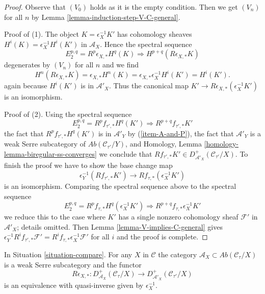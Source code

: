 \begin{proof}
Observe that $(V_0)$ holds as it is the empty condition.
Then we get $(V_n)$ for all $n$ by
Lemma \ref{lemma-induction-step-V-C-general}.

\medskip\noindent
Proof of (1). The object $K = \epsilon_X^{-1}K'$ has cohomology
sheaves $H^i(K) = \epsilon_X^{-1}H^i(K')$ in $\mathcal{A}_X$.
Hence the spectral sequence
$$
E_2^{p, q} = R^p\epsilon_{X, *} H^q(K) \Rightarrow
H^{p + q}(R\epsilon_{X, *}K)
$$
degenerates by $(V_n)$ for all $n$ and we find
$$
H^n(R\epsilon_{X, *}K) = \epsilon_{X, *}H^n(K) =
\epsilon_{X, *}\epsilon_X^{-1}H^i(K') = H^i(K').
$$
again because $H^i(K')$ is in $\mathcal{A}'_X$.
Thus the canonical map $K' \to R\epsilon_{X, *}(\epsilon_X^{-1}K')$
is an isomorphism.

\medskip\noindent
Proof of (2). Using the spectral sequence
$$
E_2^{p, q} = R^pf_{\tau', *}H^q(K') \Rightarrow R^{p + q}f_{\tau', *}K'
$$
the fact that $R^pf_{\tau', *}H^q(K')$ is in
$\mathcal{A}'_Y$ by (\ref{item-A-and-P}),
the fact that $\mathcal{A}'_Y$ is a weak Serre subcategory of
$\textit{Ab}(\mathcal{C}_{\tau'}/Y)$,
and Homology, Lemma \ref{homology-lemma-biregular-ss-converges}
we conclude that
$Rf_{\tau', *}K' \in D^+_{\mathcal{A}'_X}(\mathcal{C}_{\tau'}/X)$.
To finish the proof we have to show the base change map
$$
\epsilon_Y^{-1}(Rf_{\tau', *}K')
\longrightarrow
Rf_{\tau, *}(\epsilon_X^{-1}K')
$$
is an isomorphism. Comparing the spectral sequence above to the
spectral sequence
$$
E_2^{p, q} = R^pf_{\tau, *}H^q(\epsilon_X^{-1}K')
\Rightarrow R^{p + q}f_{\tau, *}\epsilon_X^{-1}K'
$$
we reduce this to the case where $K'$ has a single nonzero
cohomology sheaf $\mathcal{F}'$ in $\mathcal{A}'_X$; details omitted.
Then Lemma \ref{lemma-V-implies-C-general} gives
$\epsilon_Y^{-1}R^if_{\tau', *}\mathcal{F}' =
R^if_{\tau, *}\epsilon_X^{-1}\mathcal{F}'$ for all $i$
and the proof is complete.
\end{proof}

\begin{lemma}
\label{lemma-cohomological-descent-general}
In Situation \ref{situation-compare}. For any $X$ in
$\mathcal{C}$ the category
$\mathcal{A}_X \subset \textit{Ab}(\mathcal{C}_\tau/X)$
is a weak Serre subcategory and the functor
$$
R\epsilon_{X, *} :
D^+_{\mathcal{A}_X}(\mathcal{C}_\tau/X)
\longrightarrow
D^+_{\mathcal{A}'_X}(\mathcal{C}_{\tau'}/X)
$$
is an equivalence with quasi-inverse given by $\epsilon_X^{-1}$.
\end{lemma}

